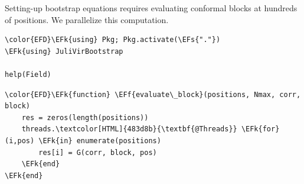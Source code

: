 \documentclass[a4paper]{article}
\numberwithin{equation}{section}
\newcommand{\EFs}[1]{\textcolor{EFs}{#1}} %
\newcommand{\EFk}[1]{\textcolor{EFk}{#1}} %
\newcommand{\EFf}[1]{\textcolor{EFf}{#1}} %
\begin{document}
Setting-up bootstrap equations requires evaluating conformal blocks at hundreds of positions. We parallelize this computation.

\begin{Code}
\begin{Verbatim}
\color{EFD}\EFk{using} Pkg; Pkg.activate(\EFs{"."})
\EFk{using} JuliVirBootstrap

help(Field)
\end{Verbatim}
\end{Code}

\begin{Code}
\begin{Verbatim}
\color{EFD}\EFk{function} \EFf{evaluate\_block}(positions, Nmax, corr, block)
    res = zeros(length(positions))
    threads.\textcolor[HTML]{483d8b}{\textbf{@Threads}} \EFk{for} (i,pos) \EFk{in} enumerate(positions)
        res[i] = G(corr, block, pos)
    \EFk{end}
\EFk{end}
\end{Verbatim}
\end{Code}
\end{document}
